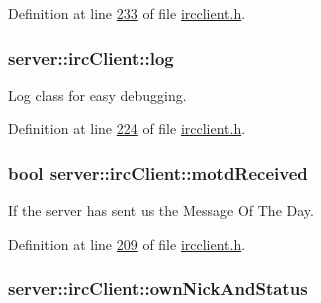 Definition at line \hyperlink{ircclient_8h_source_l00233}{233} of file \hyperlink{ircclient_8h_source}{ircclient.\-h}.

\hypertarget{classserver_1_1irc_client_ae6f6e1a1512ba04edd299f21876a84d9}{
\subsubsection[{log}]{ server\-::irc\-Client\-::log\hspace{0.3cm}{\ttfamily [private]}}}\label{d1/d10/classserver_1_1irc_client_ae6f6e1a1512ba04edd299f21876a84d9}


Log class for easy debugging. 



Definition at line \hyperlink{ircclient_8h_source_l00224}{224} of file \hyperlink{ircclient_8h_source}{ircclient.\-h}.

\hypertarget{classserver_1_1irc_client_aa5a321d1684c24415e65752c0359de2d}{
\subsubsection[{motd\-Received}]{\setlength{\rightskip}{0pt plus 5cm}bool server\-::irc\-Client\-::motd\-Received\hspace{0.3cm}{\ttfamily [private]}}}\label{d1/d10/classserver_1_1irc_client_aa5a321d1684c24415e65752c0359de2d}


If the server has sent us the Message Of The Day. 



Definition at line \hyperlink{ircclient_8h_source_l00209}{209} of file \hyperlink{ircclient_8h_source}{ircclient.\-h}.

\hypertarget{classserver_1_1irc_client_a9cd79c3e48bbee04bd70596962a83ebc}{
\subsubsection[{own\-Nick\-And\-Status}]{ server\-::irc\-Client\-::own\-Nick\-And\-Status\hspace{0.3cm}{\ttfamily [private]}}}\label{d1/d10/classserver_1_1irc_client_a9cd79c3e48bbee04bd70596962a83ebc}


